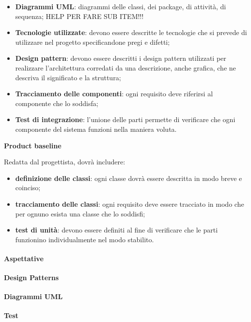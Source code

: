 \begin{itemize}
\item \textbf{Diagrammi UML}: diagrammi delle classi, dei package, di attività, di sequenza; HELP PER FARE SUB ITEM!!! 
\item \textbf{Tecnologie utilizzate}: devono essere descritte le tecnologie che si prevede di utilizzare nel progetto specificandone pregi e difetti;
\item \textbf{Design pattern}: devono essere descritti i design pattern utilizzati per realizzare l'architettura corredati da una descrizione, anche grafica, che ne descriva il significato e la struttura;
\item \textbf{Tracciamento delle componenti}: ogni requisito deve riferirsi al componente che lo soddisfa;
\item \textbf{Test di integrazione}: l'unione delle parti permette di verificare che ogni componente del sistema funzioni nella maniera voluta.
\end{itemize}

\textbf{Product baseline}

Redatta dal progettista, dovrà includere:

\begin{itemize}
\item \textbf{definizione delle classi}: ogni classe dovrà essere descritta in modo breve e coinciso;
\item \textbf{tracciamento delle classi}: ogni requisito deve essere tracciato in modo che per ognuno esista una classe che lo soddisfi;
\item \textbf{test di unità}: devono essere definiti al fine di verificare che le parti funzionino individualmente nel modo stabilito.
\end{itemize}

\paragraph{Aspettative}
\paragraph{Design Patterns}
\paragraph{Diagrammi UML}
\paragraph{Test}

